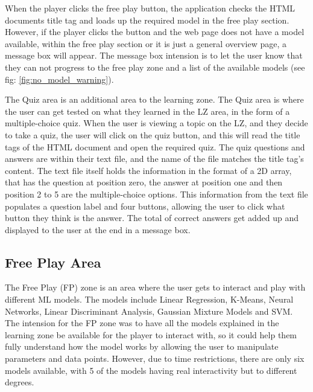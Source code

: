 		When the player clicks the free play button, the application checks the HTML documents title tag and loads up the required model in the free play section. However, if the player clicks the button and the web page does not have a model available, within the free play section or it is just a general overview page, a message box will appear. The message box intension is to let the user know that they can not progress to the free play zone and a list of the available models (see fig: \ref{fig:no_model_warning}).
	
		The Quiz area is an additional area to the learning zone. The Quiz area is where the user can get tested on what they learned in the LZ area, in the form of a multiple-choice quiz. When the user is viewing a topic on the LZ, and they decide to take a quiz, the user will click on the quiz button, and this will read the title tags of the HTML document and open the required quiz. The quiz questions and answers are within their text file, and the name of the file matches the title tag's content. The text file itself holds the information in the format of a 2D array, that has the question at position zero, the answer at position one and then position 2 to 5 are the multiple-choice options. This information from the text file populates a question label and four buttons, allowing the user to click what button they think is the answer. The total of correct answers get added up and displayed to the user at the end in a message box.
	
	\subsection{Free Play Area}
	
		The Free Play (FP) zone is an area where the user gets to interact and play with different ML models. The models include Linear Regression, K-Means, Neural Networks, Linear Discriminant Analysis, Gaussian Mixture Models and SVM. The intension for the FP zone was to have all the models explained in the learning zone be available for the player to interact with, so it could help them fully understand how the model works by allowing the user to manipulate parameters and data points. However, due to time restrictions, there are only six models available, with 5 of the models having real interactivity but to different degrees.
		
